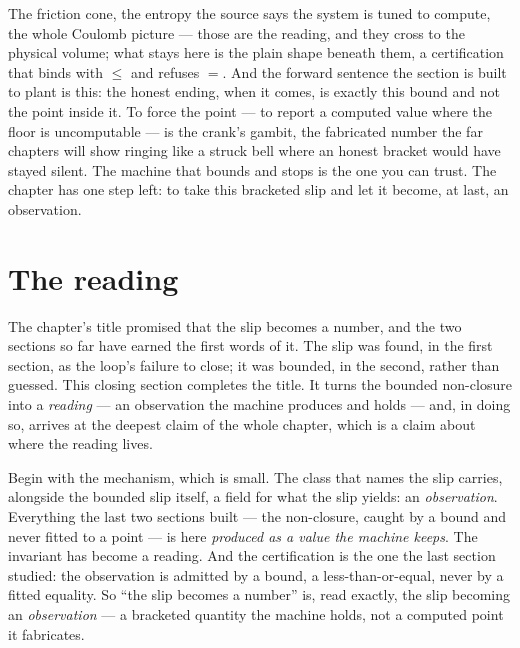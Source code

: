 The friction cone, the entropy the source says the system is tuned to compute, the whole Coulomb picture --- those are
the reading, and they cross to the physical volume; what stays here is the plain shape beneath them, a certification
that binds with \(\le\) and refuses \(=\). And the forward sentence the section is built to plant is this: the honest
ending, when it comes, is exactly this bound and not the point inside it. To force the point --- to report a computed
value where the floor is uncomputable --- is the crank's gambit, the fabricated number the far chapters will show
ringing like a struck bell where an honest bracket would have stayed silent. The machine that bounds and stops is the
one you can trust. The chapter has one step left: to take this bracketed slip and let it become, at last, an
observation.

\section{The reading}

The chapter's title promised that the slip becomes a number, and the two sections so far have earned the first words of
it. The slip was found, in the first section, as the loop's failure to close; it was bounded, in the second, rather
than guessed. This closing section completes the title. It turns the bounded non-closure into a \emph{reading} --- an
observation the machine produces and holds --- and, in doing so, arrives at the deepest claim of the whole chapter,
which is a claim about where the reading lives.

Begin with the mechanism, which is small. The class that names the slip carries, alongside the bounded slip itself, a
field for what the slip yields: an \emph{observation}. Everything the last two sections built --- the non-closure,
caught by a bound and never fitted to a point --- is here \emph{produced as a value the machine keeps}. The invariant
has become a reading. And the certification is the one the last section studied: the observation is admitted by a
bound, a less-than-or-equal, never by a fitted equality. So ``the slip becomes a number'' is, read exactly, the slip
becoming an \emph{observation} --- a bracketed quantity the machine holds, not a computed point it fabricates.

